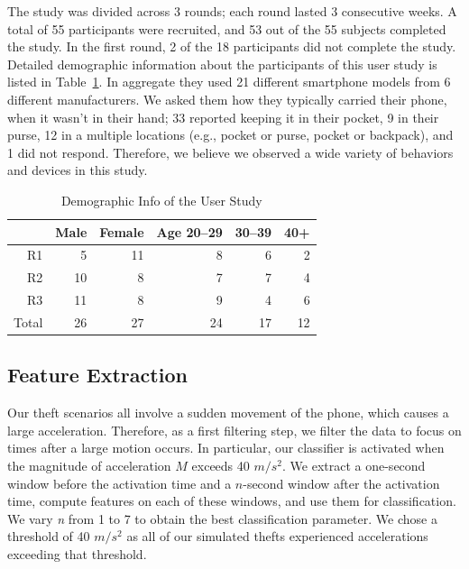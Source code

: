 \documentclass{soups}
\begin{document}
The study was divided across 3 rounds; each round lasted 3 consecutive weeks. 
A total of 55 participants were recruited, and
53 out of the 55 subjects completed the study. 
In the first round, 2 of the 18 participants did not complete the study.
Detailed demographic information about the participants of this user study is listed in Table~\ref{tbl:demographics}.
In aggregate they used 21 different smartphone models from 6 different manufacturers.
We asked them how they typically carried their phone, when it wasn't in their hand; 33 reported keeping it in their pocket, 9 in their purse, 12 in a multiple locations (e.g., pocket or purse, pocket or backpack), and 1 did not respond.
Therefore, we believe we observed a wide variety of behaviors and devices in this study.

\begin{table}[H]
\centering
\begin{tabular}{rrrrrr}
\hline
      & Male & Female & Age 20--29 & 30--39 & 40+ \\ \hline
R1    & 5    & 11     & 8         & 6     & 2   \\
R2    & 10   & 8      & 7         & 7     & 4   \\
R3    & 11   & 8      & 9         & 4     & 6   \\
Total & 26   & 27     & 24        & 17    & 12  \\ \hline
\end{tabular}
\caption{Demographic Info of the User Study}
\label{tbl:demographics}
\end{table}




\subsection{Feature Extraction}
\label{s:features}

Our theft scenarios all involve a sudden movement of the phone, which causes a large acceleration.
Therefore, as a first filtering step, we filter the data to focus on times after a large motion occurs.
In particular, our classifier is activated when the magnitude of acceleration $M$ exceeds 40 $m/s^2$.
We extract a one-second window before the activation time and a $n$-second window after the activation time, compute features on each of these windows, and use them for classification.
We vary \textit{n} from 1 to 7 to obtain the best classification parameter.
We chose a threshold of 40 $m/s^2$ as all of our simulated thefts experienced accelerations exceeding that threshold.
\end{document}
